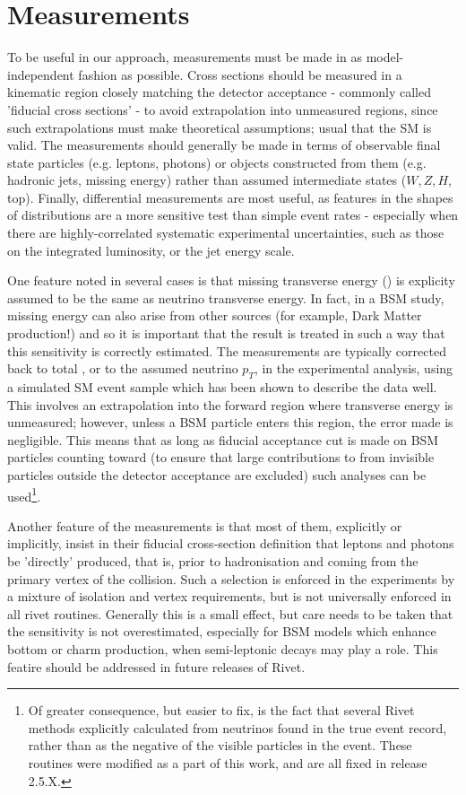\documentclass[floatfix]{article}
\begin{document}
\section{Measurements}\label{sec:measurements}

To be useful in our approach, measurements must be made in as model-independent fashion as possible. 
Cross sections should be measured in a kinematic region closely matching the detector acceptance - commonly called 
'fiducial cross sections' - to avoid extrapolation into unmeasured regions, since such extrapolations must make 
theoretical assumptions; usual that the SM is valid. The measurements should generally be made in terms of observable final
state particles (e.g. leptons, photons) or objects constructed from them (e.g. hadronic jets, missing energy) 
rather than assumed intermediate states ($W, Z, H$, top). Finally, differential measurements are most useful, as features
in the shapes of distributions are a more sensitive test than simple event rates - especially when there are
highly-correlated systematic experimental uncertainties, such as those on the integrated luminosity, or the jet energy scale.

One feature noted in several cases is that missing transverse energy (\MET) is 
explicity assumed to be the same as neutrino transverse energy. In fact, in a BSM study, missing energy can also 
arise from other sources (for example, Dark Matter production!) and so it is important that the result is treated in such a 
way that this sensitivity is correctly estimated. The measurements are typically corrected back to total \MET, 
or to the assumed neutrino $p_T$, in the experimental analysis, using a simulated SM event sample which has been shown to describe
the data well. This involves an extrapolation into the forward 
region where transverse energy is unmeasured; however, unless a BSM particle enters this region, the error made is 
negligible. This means that as long as fiducial acceptance cut is made on BSM particles counting toward \MET (to ensure that 
large contributions to \MET 
from invisible particles outside the detector acceptance are excluded) such analyses can be 
used\footnote{Of greater consequence, but easier to fix, is the fact that several Rivet methods explicitly calculated \MET
from neutrinos found in the true event record, rather than as the negative of the visible particles in the event. These 
routines were modified as a part of this work, and are all fixed in release 2.5.X.}.

Another feature of the measurements is that most of them, explicitly or implicitly, insist in their fiducial cross-section definition 
that leptons and photons be 'directly' produced, that is, prior to hadronisation and coming from the primary vertex of the collision. 
Such a selection is enforced in the experiments by a mixture of isolation and vertex requirements, but is not universally enforced
in all rivet routines. Generally this is a small effect, but care needs to be taken that the sensitivity is not overestimated, especially
for BSM models which enhance bottom or charm production, when semi-leptonic decays may play a role.
This featire should be addressed in future releases of Rivet.
\end{document}
